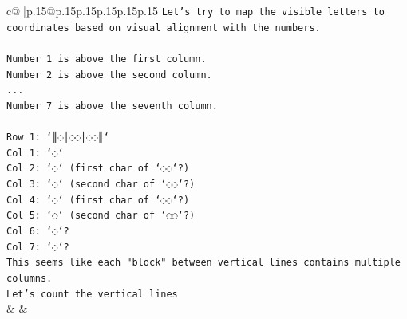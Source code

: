 \documentclass{article}
\begin{document}
{\begin{supertabular}{c@{$\;$}|p{.15\linewidth}@{}p{.15\linewidth}p{.15\linewidth}p{.15\linewidth}p{.15\linewidth}p{.15\linewidth}}
{{{\texttt{Let's try to map the visible letters to coordinates based on visual alignment with the numbers.} \\
\\ 
\texttt{Number 1 is above the first column.} \\
\texttt{Number 2 is above the second column.} \\
\texttt{...} \\
\texttt{Number 7 is above the seventh column.} \\
\\ 
\texttt{Row 1: `║◌│◌◌│◌◌║`} \\
\texttt{Col 1: `◌`} \\
\texttt{Col 2: `◌` (first char of `◌◌`?)} \\
\texttt{Col 3: `◌` (second char of `◌◌`?)} \\
\texttt{Col 4: `◌` (first char of `◌◌`?)} \\
\texttt{Col 5: `◌` (second char of `◌◌`?)} \\
\texttt{Col 6: `◌`?} \\
\texttt{Col 7: `◌`?} \\
\texttt{This seems like each "block" between vertical lines contains multiple columns.} \\
\texttt{Let's count the vertical lines} \\
            }
        }
    }
    & & \\ \\


\end{supertabular}}
\end{document}
